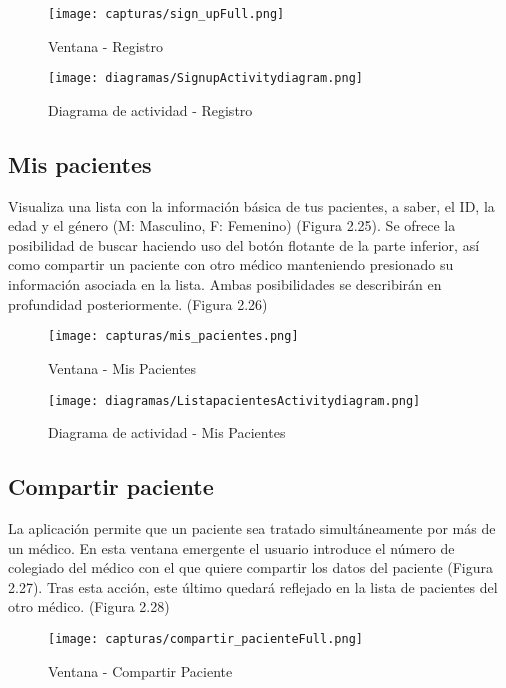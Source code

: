 \documentclass[11pt,spanish,
		listoftables,listoffigures]
		{tfgplantilla}
\begin{document}
\begin{figure}[H]
\centering
\texttt{[image: capturas/sign\_upFull.png]}
\caption{Ventana - Registro}
\end{figure}

\newpage
\begin{figure}[H]
\centering
\texttt{[image: diagramas/SignupActivitydiagram.png]}
\caption{Diagrama de actividad - Registro}
\end{figure}

\newpage
\subsection {Mis pacientes}

Visualiza una lista con la información básica de tus pacientes, a saber, el ID, la edad y el género (M: Masculino, F: Femenino) (Figura 2.25). Se ofrece la posibilidad de buscar haciendo uso del botón flotante de la parte inferior, así como compartir un paciente con otro médico manteniendo presionado su información asociada en la lista. Ambas posibilidades se describirán en profundidad posteriormente. (Figura 2.26)

\begin{figure}[H]
\centering
\texttt{[image: capturas/mis\_pacientes.png]}
\caption{Ventana - Mis Pacientes}
\end{figure}

\begin{figure}[H]
\centering
\texttt{[image: diagramas/ListapacientesActivitydiagram.png]}
\caption{Diagrama de actividad - Mis Pacientes}
\end{figure}

\subsection {Compartir paciente}

La aplicación permite que un paciente sea tratado simultáneamente  por más de un médico. En esta ventana emergente el usuario introduce el número de colegiado del médico con el que quiere compartir los datos del paciente (Figura 2.27). Tras esta acción, este último quedará reflejado en la lista de pacientes del otro médico. (Figura 2.28)

\begin{figure}[H]
\centering
\texttt{[image: capturas/compartir\_pacienteFull.png]}
\caption{Ventana - Compartir Paciente}
\end{figure}
\end{document}
